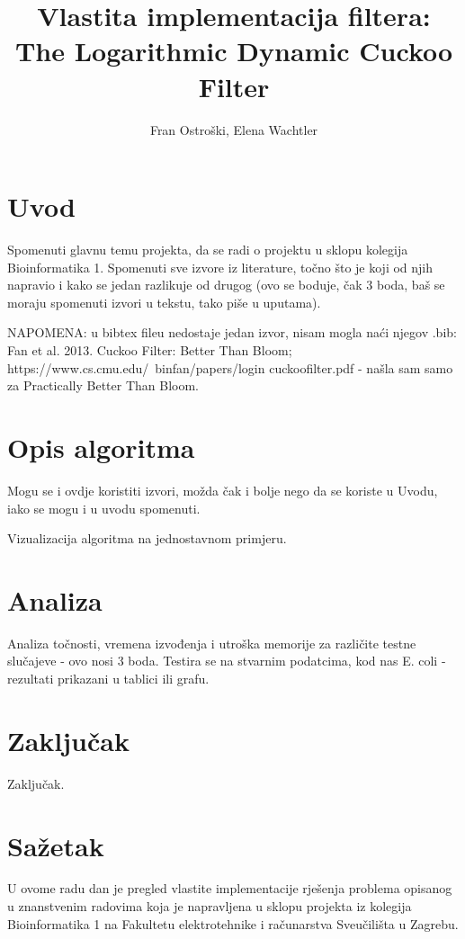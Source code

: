 \documentclass[times, utf8, seminar, numeric]{fer}
\begin{document}
\nocite{*}

\title{Vlastita implementacija filtera: \protect\\ The Logarithmic Dynamic Cuckoo Filter}

\author{Fran Ostroški, Elena Wachtler}


\maketitle

\tableofcontents

\chapter{Uvod}
Spomenuti glavnu temu projekta, da se radi o projektu u sklopu kolegija Bioinformatika 1. Spomenuti sve izvore iz literature, točno što je koji od njih napravio i kako se jedan razlikuje od drugog (ovo se boduje, čak 3 boda, baš se moraju spomenuti izvori u tekstu, tako piše u uputama).

NAPOMENA: u bibtex fileu nedostaje jedan izvor, nisam mogla naći njegov .bib: 
Fan et al. 2013. Cuckoo Filter: Better Than Bloom; https://www.cs.cmu.edu/~binfan/papers/login cuckoofilter.pdf - našla sam samo za Practically Better Than Bloom.

\chapter{Opis algoritma}
Mogu se i ovdje koristiti izvori, možda čak i bolje nego da se koriste u Uvodu, iako se mogu i u uvodu spomenuti.

Vizualizacija algoritma na jednostavnom primjeru.

\chapter{Analiza}
Analiza točnosti, vremena izvođenja i utroška memorije za različite testne slučajeve - ovo nosi 3 boda. Testira se na stvarnim podatcima, kod nas E. coli - rezultati prikazani u tablici ili grafu.

\chapter{Zaključak}
Zaključak.




\chapter{Sažetak}
U ovome radu dan je pregled vlastite implementacije rješenja problema opisanog u znanstvenim radovima koja je napravljena u sklopu projekta iz kolegija Bioinformatika 1 na Fakultetu elektrotehnike i računarstva Sveučilišta u Zagrebu.
\end{document}
